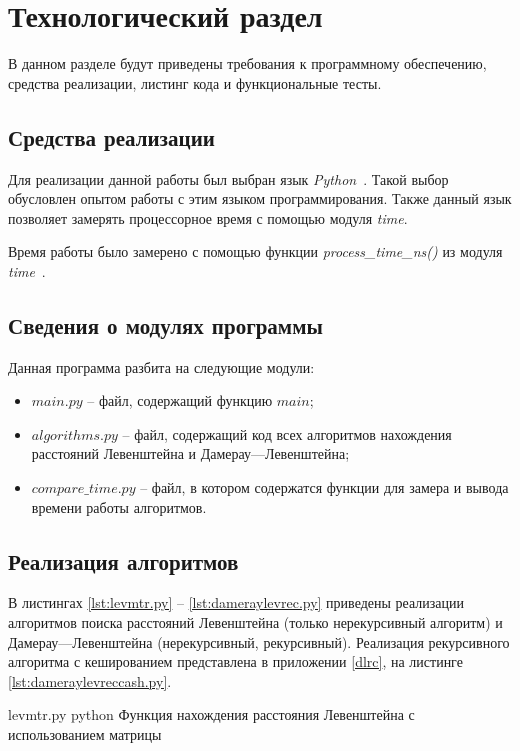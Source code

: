 \chapter{Технологический раздел}

В данном разделе будут приведены требования к программному обеспечению, средства реализации, листинг кода и функциональные тесты.

\section{Средства реализации}

Для реализации данной работы был выбран язык \textit{Python}~\cite{python}. Такой выбор обусловлен опытом работы с этим языком программирования. Также данный язык позволяет замерять процессорное время с помощью модуля \textit{time}.

Время работы было замерено с помощью функции \textit{process\_time\_ns()} из модуля \textit{time}~\cite{python-time}.

\section{Сведения о модулях программы}

Данная программа разбита на следующие модули:
\begin{itemize}
	\item $main.py$ -- файл, содержащий функцию $main$;
	\item $algorithms.py$ -- файл, содержащий код всех алгоритмов нахождения расстояний Левенштейна и Дамерау---Левенштейна;
	\item $compare\_time.py$ -- файл, в котором содержатся функции для замера и вывода времени работы алгоритмов.
\end{itemize}

\section{Реализация алгоритмов}

В листингах \ref{lst:levmtr.py} -- \ref{lst:dameraylevrec.py} приведены реализации алгоритмов поиска расстояний Левенштейна (только нерекурсивный алгоритм) и Дамерау---Левенштейна (нерекурсивный, рекурсивный). Реализация рекурсивного алгоритма с кешированием представлена в приложении \ref{dlrc}, на листинге \ref{lst:dameraylevreccash.py}.

\clearpage

{levmtr.py} %
{python} %
{Функция нахождения расстояния Левенштейна с использованием матрицы} %


